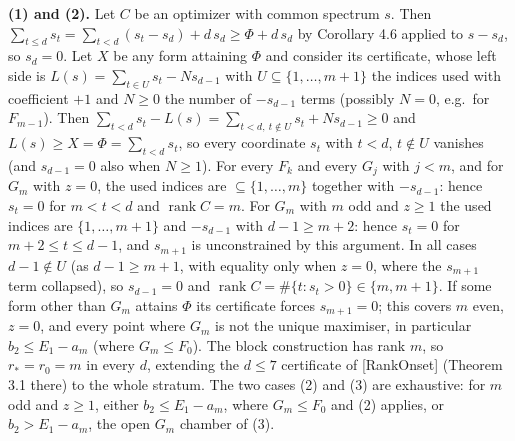 \documentclass[
  11pt,
  a4paper,
]{article}
\begin{document}
\textbf{(1) and (2).} Let \(C\) be an optimizer with common spectrum
\(s\). Then
\(\sum_{t\le d}s_t=\sum_{t<d}(s_t-s_d)+d\,\allowbreak{}s_d\ge\Phi+d\,\allowbreak{}s_d\) by
Corollary 4.6 applied to \(s-s_d\), so \(s_d=0\). Let \(X\) be any form
attaining \(\Phi\) and consider its certificate, whose left side is
\(L(s)=\sum_{t\in U}s_t-Ns_{d-1}\) with \(U\subseteq\{1,\allowbreak{}\dots,\allowbreak{}m+1\}\)
the indices used with coefficient \(+1\) and \(N\ge0\) the number of
\(-s_{d-1}\) terms (possibly \(N=0\), e.g.~for \(F_{m-1}\)). Then
\(\sum_{t<d}s_t-L(s)=\sum_{t<d,\allowbreak{}\ t\notin U}s_t+Ns_{d-1}\ge0\) and
\(L(s)\ge X=\Phi=\sum_{t<d}s_t\), so every coordinate \(s_t\) with
\(t<d\), \(t\notin U\) vanishes (and \(s_{d-1}=0\) also when \(N\ge1\)).
For every \(F_k\) and every \(G_j\) with \(j<m\), and for \(G_m\) with
\(z=0\), the used indices are \(\subseteq\{1,\allowbreak{}\dots,\allowbreak{}m\}\) together with
\(-s_{d-1}\): hence \(s_t=0\) for \(m<t<d\) and
\(\operatorname{rank}C=m\). For \(G_m\) with \(m\) odd and \(z\ge1\) the
used indices are \(\{1,\allowbreak{}\dots,\allowbreak{}m+1\}\) and \(-s_{d-1}\) with
\(d-1\ge m+2\): hence \(s_t=0\) for \(m+2\le t\le d-1\), and \(s_{m+1}\)
is unconstrained by this argument. In all cases \(d-1\notin U\) (as
\(d-1\ge m+1\), with equality only when \(z=0\), where the \(s_{m+1}\)
term collapsed), so \(s_{d-1}=0\) and
\(\operatorname{rank}C=\#\{t:s_t>0\}\in\{m,\allowbreak{}m+1\}\). If some form other
than \(G_m\) attains \(\Phi\) its certificate forces \(s_{m+1}=0\); this
covers \(m\) even, \(z=0\), and every point where \(G_m\) is not the
unique maximiser, in particular \(b_2\le E_1-a_m\) (where
\(G_m\le F_0\)). The block construction has rank \(m\), so \(r_*=r_0=m\)
in every \(d\), extending the \(d\le7\) certificate of {[}RankOnset{]}
(Theorem 3.1 there) to the whole stratum. The two cases (2) and (3) are
exhaustive: for \(m\) odd and \(z\ge1\), either \(b_2\le E_1-a_m\),
where \(G_m\le F_0\) and (2) applies, or \(b_2>E_1-a_m\), the open
\(G_m\) chamber of (3).
\end{document}
